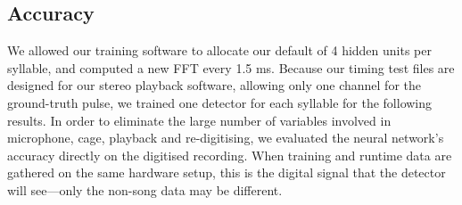 \documentclass[10pt,letterpaper]{article}
\let\oldmarginpar\marginpar
\renewcommand{\marginpar}[1]{\oldmarginpar{\linespread{1}\scriptsize{#1}}}
\begin{document}
\subsection{Accuracy}


We allowed our training software to allocate our default of 4 hidden
units per syllable, and computed a new FFT every 1.5 ms.  Because our
timing test files are designed for our stereo playback software,
allowing only one channel for the ground-truth pulse, we trained one
detector for each syllable for the following results.  In order to
eliminate the large number of variables involved in microphone, cage,
playback and re-digitising, we evaluated the neural network's accuracy
directly on the digitised recording.  When training and runtime data
are gathered on the same hardware setup, this is the digital signal
that the detector will see---only the non-song data may be different.
\end{document}
